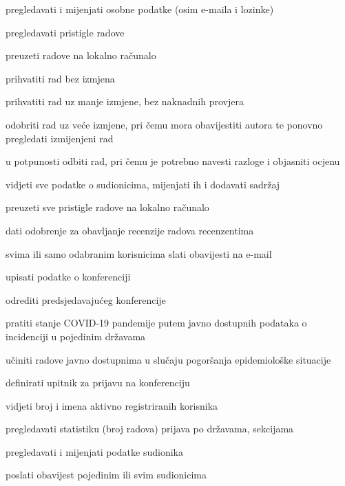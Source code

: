 \begin{packed_enum}
\begin{packed_enum}
\begin{packed_enum}
						\item pregledavati i mijenjati osobne podatke (osim e-maila i lozinke)
						\item pregledavati pristigle radove
						\item preuzeti radove na lokalno računalo
						\item prihvatiti rad bez izmjena
						\item prihvatiti rad uz manje izmjene, bez naknadnih provjera
						\item odobriti rad uz veće izmjene, pri čemu mora obavijestiti autora te ponovno pregledati izmijenjeni rad
						\item u potpunosti odbiti rad, pri čemu je potrebno navesti razloge i objasniti ocjenu
					
					
					\end{packed_enum}
				
					\item  {}
				
					\begin{packed_enum}
				
						\item vidjeti sve podatke o sudionicima, mijenjati ih i dodavati sadržaj
						\item preuzeti sve pristigle radove na lokalno računalo
						\item dati odobrenje za obavljanje recenzije radova recenzentima
						\item svima ili samo odabranim korisnicima slati obavijesti na e-mail
					
				
					\end{packed_enum}
				
					\item  {}
				
					\begin{packed_enum}
				
						\item upisati podatke o konferenciji
						\item odrediti predsjedavajućeg konferencije
						\item pratiti stanje COVID-19 pandemije putem javno dostupnih podataka o incidenciji u pojedinim državama
						\item učiniti radove javno dostupnima u slučaju pogoršanja epidemiološke situacije
						\item definirati upitnik za prijavu na konferenciju
						\item vidjeti broj i imena aktivno registriranih korisnika
						\item pregledavati statistiku (broj radova) prijava po državama, sekcijama
						\item pregledavati i mijenjati podatke sudionika
						\item poslati obavijest pojedinim ili svim sudionicima 


\end{packed_enum}
\end{packed_enum}
\end{packed_enum}
